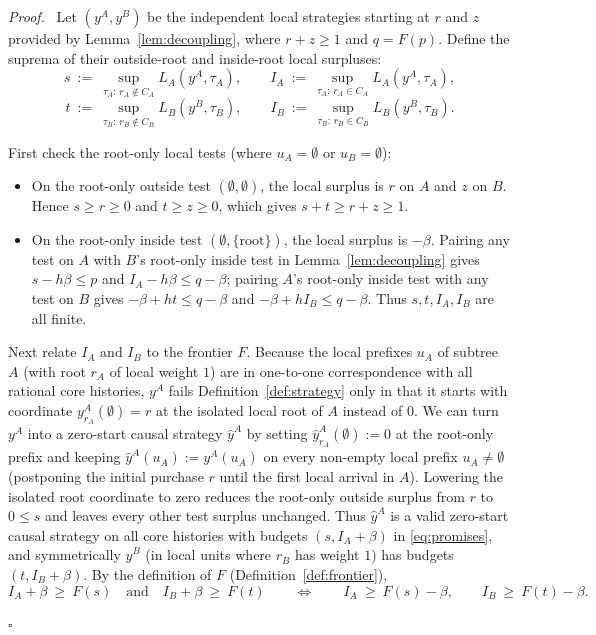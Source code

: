 \documentclass[11pt,letterpaper]{article}
\newenvironment{proof}[1][Proof]{\par\smallskip\noindent\textit{#1.}\ \ignorespaces}{\hfill$\square$\par\medskip}
\begin{document}
\begin{proof}
Let $(y^A,y^B)$ be the independent local strategies starting at $r$ and $z$ provided by Lemma~\ref{lem:decoupling}, where $r+z\ge 1$ and $q=F(p)$. Define the suprema of their outside-root and inside-root local surpluses:
\[
  s\ :=\ \sup_{\tau_A:\,r_A\notin C_A} L_A(y^A,\tau_A),\qquad
  I_A\ :=\ \sup_{\tau_A:\,r_A\in C_A} L_A(y^A,\tau_A),
\]
\[
  t\ :=\ \sup_{\tau_B:\,r_B\notin C_B} L_B(y^B,\tau_B),\qquad
  I_B\ :=\ \sup_{\tau_B:\,r_B\in C_B} L_B(y^B,\tau_B).
\]

First check the root-only local tests (where $u_A=\emptyset$ or $u_B=\emptyset$):
\begin{itemize}
\item On the root-only outside test $(\emptyset,\emptyset)$, the local surplus is $r$ on $A$ and $z$ on $B$. Hence $s\ge r\ge 0$ and $t\ge z\ge 0$, which gives $s+t\ge r+z\ge 1$.
\item On the root-only inside test $(\emptyset,\{\text{root}\})$, the local surplus is $-\beta$. Pairing any test on $A$ with $B$'s root-only inside test in Lemma~\ref{lem:decoupling} gives $s - h\beta \le p$ and $I_A - h\beta \le q-\beta$; pairing $A$'s root-only inside test with any test on $B$ gives $-\beta + ht \le q-\beta$ and $-\beta + h I_B \le q-\beta$. Thus $s,t,I_A,I_B$ are all finite.
\end{itemize}

Next relate $I_A$ and $I_B$ to the frontier $F$. Because the local prefixes $u_A$ of subtree $A$ (with root $r_A$ of local weight $1$) are in one-to-one correspondence with all rational core histories, $y^A$ fails Definition~\ref{def:strategy} only in that it starts with coordinate $y^A_{r_A}(\emptyset)=r$ at the isolated local root of $A$ instead of $0$. We can turn $y^A$ into a zero-start causal strategy $\hat y^A$ by setting $\hat y^A_{r_A}(\emptyset):=0$ at the root-only prefix and keeping $\hat y^A(u_A):=y^A(u_A)$ on every non-empty local prefix $u_A\neq\emptyset$ (postponing the initial purchase $r$ until the first local arrival in $A$). Lowering the isolated root coordinate to zero reduces the root-only outside surplus from $r$ to $0\le s$ and leaves every other test surplus unchanged. Thus $\hat y^A$ is a valid zero-start causal strategy on all core histories with budgets $(s, I_A+\beta)$ in \eqref{eq:promises}, and symmetrically $\hat y^B$ (in local units where $r_B$ has weight $1$) has budgets $(t, I_B+\beta)$. By the definition of $F$ (Definition~\ref{def:frontier}),
\[
  I_A + \beta\ \ge\ F(s) \quad\text{and}\quad I_B + \beta\ \ge\ F(t)
  \qquad\Longleftrightarrow\qquad
  I_A\ \ge\ F(s)-\beta,\qquad I_B\ \ge\ F(t)-\beta.
\]


\end{proof}
\end{document}
